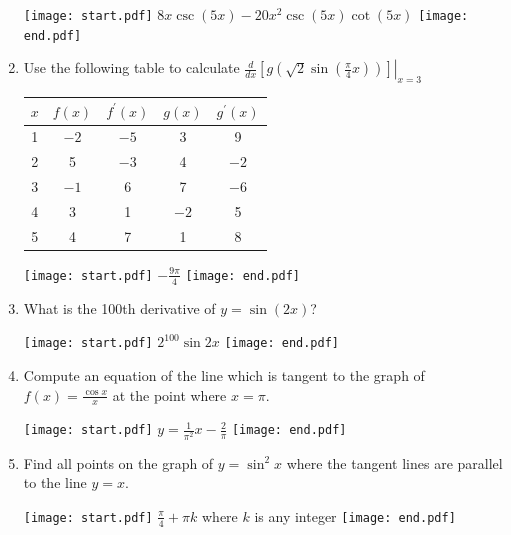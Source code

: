 \documentclass[12pt]{article}
\begin{document}
\begin{enumerate}
\texttt{[image: start.pdf]}
{{$8x\csc{(5x)}-20x^2\csc{(5x)}\cot{(5x)}$}}
\texttt{[image: end.pdf]}


\item Use the following table to calculate $\left.\frac{d}{dx}\left[g\left(\sqrt{2}\sin{\left(\frac{\pi}{4}x\right)}\right)\right]\right|_{x=3}$

\begin{center}
\begin{tabular}{c|c|c|c|c}
$x$ & $f(x)$ & $f^{\prime}(x)$ & $g(x)$ & $g^{\prime}(x)$\\
\hline
1 & $-2$ & $-5$ & 3 & 9\\
2& 5 & $-3$ & 4 & $-2$\\
3 & $-1$ & 6  & 7 & $-6$\\
4 & 3 & 1 & $-2$ & 5\\
5 & 4 & 7 & 1 & 8
\end{tabular}
\end{center}

\texttt{[image: start.pdf]}
{{$-\frac{9\pi}{4}$}}
\texttt{[image: end.pdf]}


\item What is the 100th derivative of $y=\sin{(2x)}$?

\texttt{[image: start.pdf]}
{{$2^{100}\sin{2x}$}}
\texttt{[image: end.pdf]}


\item Compute an equation of the line which is tangent to the graph of $f(x)=\frac{\cos{x}}{x}$ at the point where $x=\pi$.

\texttt{[image: start.pdf]}
{{$y=\frac{1}{\pi^2}x-\frac{2}{\pi}$}}
\texttt{[image: end.pdf]}


\item Find all points on the graph of $y=\sin^2{x}$ where the tangent lines are parallel to the line $y=x$.

\texttt{[image: start.pdf]}
{{$\frac{\pi}{4}+\pi k$ where $k$ is any integer}}
\texttt{[image: end.pdf]}


\end{enumerate}

\end{document}
